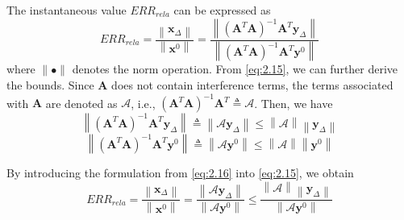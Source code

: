 \documentclass[journal]{IEEEtran}
\begin{document}
The instantaneous value ${ERR_{rela}}$ can be expressed as
\begin{equation}\label{eq:2.15}
{ERR}_{rela} = \frac{\left\|{\mathbf{x}_{\Delta}}\right\|}{\left\|{\mathbf{x}^{0}}\right\|}
 =\frac{\left\|{{{\left({{\mathbf{A}}^{T}}\mathbf{A}\right)}^{-1}}{{\mathbf{A}}^{T}}\mathbf{y}_{\Delta }}\right\|}{\left\|{{{\left({{\mathbf{A}}^{T}}\mathbf{A}\right)}^{-1}}{{\mathbf{A}}^{T}}\mathbf{y}^{0}}\right\|}
\end{equation}
where ${\|{\bullet}\|}$ denotes the norm operation. From \eqref{eq:2.15}, we can further derive the bounds. Since ${\mathbf{A}}$ does not contain interference terms, the terms associated with ${\mathbf{A}}$ are denoted as ${\mathbf{\mathcal{A}}}$, i.e., $\left(\mathbf{A}^{T}\mathbf{A}\right)^{-1}\mathbf{A}^{T} \triangleq {\mathbf{\mathcal{A}}}$. Then, we have
\begin{equation}\label{eq:2.16}
\left\| \left( \mathbf{A}^T \mathbf{A} \right)^{-1} \mathbf{A}^T \mathbf{y}_{\Delta } \right\| \triangleq \left\| \mathbf{\mathcal{A}}\mathbf{y}_{\Delta } \right\| \leq \left\| \mathbf{\mathcal{A}}\right\| \left\|\mathbf{y}_{\Delta } \right\|
\end{equation}
\begin{equation}\label{eq:2.17}
\left\| \left( \mathbf{A}^T \mathbf{A} \right)^{-1} \mathbf{A}^T \mathbf{y}^{0} \right\| \triangleq \left\| \mathbf{\mathcal{A}}\mathbf{y}^{0} \right\| \leq \left\| \mathbf{\mathcal{A}}\right\| \left\|\mathbf{y}^{0} \right\|
\end{equation}

By introducing the formulation from \eqref{eq:2.16} into \eqref{eq:2.15}, we obtain
\begin{equation}\label{eq:2.18}
{ERR}_{rela} = \frac{\left\| \mathbf{x}_{\Delta} \right\|}{\left\| \mathbf{x}^0 \right\|} = \frac{\left\| \mathbf{\mathcal{A}}\mathbf{y}_{\Delta} \right\|}{\left\| \mathbf{\mathcal{A}}\mathbf{y}^0 \right\|} \leq \frac{\left\|\mathbf{\mathcal{A}}\right\| \left\| \mathbf{y}_{\Delta} \right\|}{\left\| \mathbf{\mathcal{A}}\mathbf{y}^0 \right\|}
\end{equation}
\end{document}
